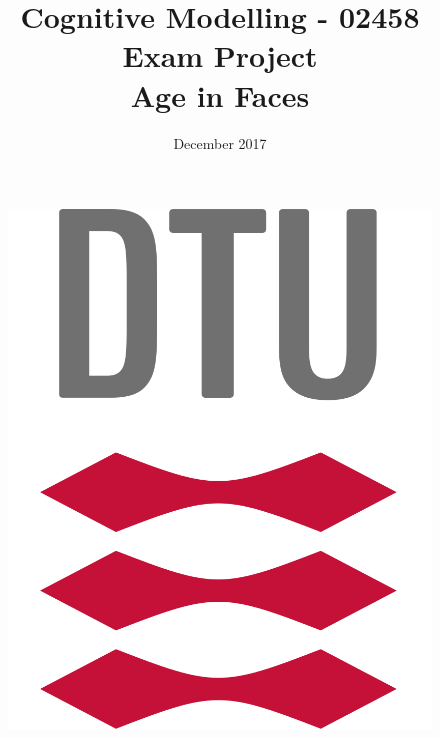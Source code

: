 \documentclass[a4paper,11pt]{article}
\title{\Huge{ \textbf{Cognitive Modelling - 02458 \\ Exam Project \\
Age in Faces}}
}
\date{December 2017}
\begin{document}
\maketitle
{}
\begin{figure}[h!]
    \centering
    \includegraphics[scale=0.12]{fig/dtu_logo.png}
\end{figure}

\newpage
\tableofcontents
\newpage
{}






\newpage



\newpage

\end{document}
